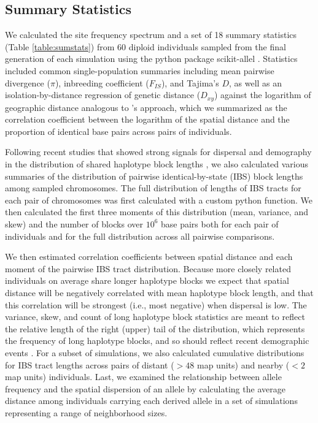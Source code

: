 \documentclass[10pt,twoside,lineno,hidelinks]{preprint}
\begin{document}
\subsection{Summary Statistics}
We calculated the site frequency spectrum and a set of 18 summary statistics (Table \ref{table:sumstats}) from 60 diploid individuals sampled from the final generation of each simulation using the python package scikit-allel \citep{Miles2017}. 
Statistics included common single-population summaries including mean pairwise divergence ($\pi$), inbreeding coefficient ($F_{IS}$), and Tajima's $D$, 
as well as an isolation-by-distance regression of genetic distance ($D_{xy}$) against the logarithm of geographic distance analogous to \cite{Rousset1997}'s approach, 
which we summarized as the correlation coefficient between the logarithm of the spatial distance and the proportion of identical base pairs across pairs of individuals. 

Following recent studies that showed strong signals for dispersal and demography in the distribution of shared haplotype block lengths \citep{Ringbauer2017,Baharian2016}, we also calculated various summaries of the distribution of pairwise identical-by-state (IBS) block lengths among sampled chromosomes. The full distribution of lengths of IBS tracts for each pair of chromosomes was first calculated with a custom python function. 
We then calculated the first three moments of this distribution (mean, variance, and skew) and the number of blocks over $10^6$ base pairs both for each pair of individuals and for the full distribution across all pairwise comparisons. 

We then estimated correlation coefficients between spatial distance and each moment of the pairwise IBS tract distribution. Because more closely related individuals on average share longer haplotype blocks we expect that spatial distance will be negatively correlated with mean haplotype block length, and that this correlation will be strongest (i.e., most negative) when dispersal is low. The variance, skew, and count of long haplotype block statistics are meant to reflect the relative length of the right (upper) tail of the distribution, which represents the frequency of long haplotype blocks, and so should reflect recent demographic events \citep{chapman2002effect}. For a subset of simulations, we also calculated cumulative distributions for IBS tract lengths across pairs of distant (${}>48$ map units) and nearby (${}<2$ map units) individuals. Last, we examined the relationship between allele frequency and the spatial dispersion of an allele by calculating the average distance among individuals carrying each derived allele in a set of simulations representing a range of neighborhood sizes.
\end{document}
